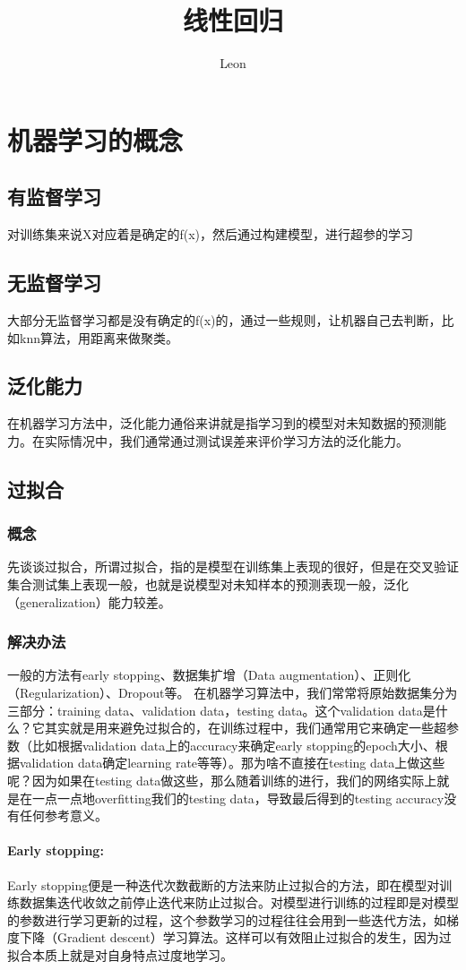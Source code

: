 \documentclass[18pt,a4paper,oneside,UTF8]{ctexart}
\author{Leon}
\title{线性回归}
\begin{document}
\maketitle
\section{机器学习的概念}
\subsection{有监督学习}
对训练集来说X对应着是确定的f(x)，然后通过构建模型，进行超参的学习
\subsection{无监督学习}
大部分无监督学习都是没有确定的f(x)的，通过一些规则，让机器自己去判断，比如knn算法，用距离来做聚类。
\subsection{泛化能力}
在机器学习方法中，泛化能力通俗来讲就是指学习到的模型对未知数据的预测能力。在实际情况中，我们通常通过测试误差来评价学习方法的泛化能力。
\subsection{过拟合}
\subsubsection{概念}
先谈谈过拟合，所谓过拟合，指的是模型在训练集上表现的很好，但是在交叉验证集合测试集上表现一般，也就是说模型对未知样本的预测表现一般，泛化（generalization）能力较差。
\subsubsection{解决办法}
一般的方法有early stopping、数据集扩增（Data augmentation）、正则化（Regularization）、Dropout等。
在机器学习算法中，我们常常将原始数据集分为三部分：training data、validation data，testing data。这个validation data是什么？它其实就是用来避免过拟合的，在训练过程中，我们通常用它来确定一些超参数（比如根据validation data上的accuracy来确定early stopping的epoch大小、根据validation data确定learning rate等等）。那为啥不直接在testing data上做这些呢？因为如果在testing data做这些，那么随着训练的进行，我们的网络实际上就是在一点一点地overfitting我们的testing data，导致最后得到的testing accuracy没有任何参考意义。
\paragraph{Early stopping:}
Early stopping便是一种迭代次数截断的方法来防止过拟合的方法，即在模型对训练数据集迭代收敛之前停止迭代来防止过拟合。对模型进行训练的过程即是对模型的参数进行学习更新的过程，这个参数学习的过程往往会用到一些迭代方法，如梯度下降（Gradient descent）学习算法。这样可以有效阻止过拟合的发生，因为过拟合本质上就是对自身特点过度地学习。
\end{document}
